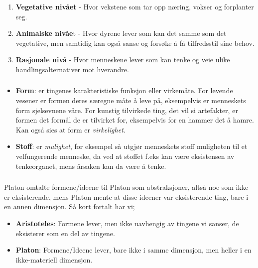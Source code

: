 \documentclass[a4paper]{IEEEtran}
\begin{document}
        \begin{enumerate}
            \item \textbf{Vegetative nivået} - Hvor vekstene som tar opp næring,
            vokser og forplanter seg. 
            \item \textbf{Animalske nivåe}t - Hvor dyrene lever som kan det samme som 
            det vegetative, men samtidig kan også sanse og forsøke å få
            tilfredsstil sine behov.
            \item \textbf{Rasjonale nivå} - Hvor menneskene lever som 
            kan tenke og veie ulike handlingsalternativer mot hverandre.
        \end{enumerate} \medskip

        \subsubsection{}
        \begin{itemize}
            \item \textbf{Form}: er tingenes karakteristiske funksjon eller virkemåte.
            For levende vesener er formen deres særegne måte å leve på, 
            eksempelvis er menneskets form sjelsevnene våre. For kunstig tilvirkede
            ting, det vil si artefakter, er formen det formål de er tilvirket for,
            eksempelvis for en hammer det å hamre. Kan også sies at form er 
            \textit{virkelighet}.

            \item \textbf{Stoff}: er \textit{mulighet}, for eksempel så 
            utgjør menneskets stoff muligheten til et velfungerende menneske, da 
            ved at stoffet f.eks kan være eksistensen av tenkeorganet, mens årsaken 
            kan da være å tenke. 
        \end{itemize} \cite{rephefte_aristoteles} \medskip

        \subsubsection{}
        Platon omtalte formene/ideene til Platon som abstraksjoner, altså noe som 
        ikke er eksisterende, mens Platon mente at disse ideener var eksisterende ting, 
        bare i en annen dimensjon. Så kort fortalt har vi;

        \begin{itemize}
            \item \textbf{Aristoteles}: Formene lever, men ikke uavhengig av tingene
            vi sanser, de eksisterer som en del av tingene.
            \item \textbf{Platon}: Formene/Ideene lever, bare ikke i samme dimensjon, men 
            heller i en ikke-materiell dimensjon.
        \end{itemize}
\end{document}
